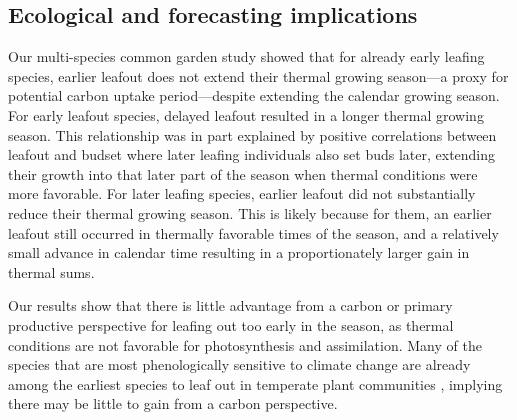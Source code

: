 \documentclass{article}[12pt]
\begin{document}
\subsection{Ecological and forecasting implications}
Our multi-species common garden study showed that for already early leafing species, earlier leafout does not extend their thermal growing season---a proxy for potential carbon uptake period---despite extending the calendar growing season. For early leafout species, delayed leafout resulted in a longer thermal growing season. This relationship was in part explained by positive correlations between leafout and budset where later leafing individuals also set buds later, extending their growth into that later part of the season when thermal conditions were more favorable.  For later leafing species, earlier leafout did not substantially reduce their thermal growing season. This is likely because for them, an earlier leafout still occurred in thermally favorable times of the season, and a relatively small advance in calendar time resulting in a proportionately larger gain in thermal sums.

Our results show that there is little advantage from a carbon or primary productive perspective for leafing out too early in the season, as thermal conditions are not favorable for photosynthesis and assimilation. Many of the species that are most phenologically sensitive to climate change are already among the earliest species to leaf out in temperate plant communities \citep{Shen2014,Geng2020}, implying there may be little to gain from a carbon perspective.
\end{document}
